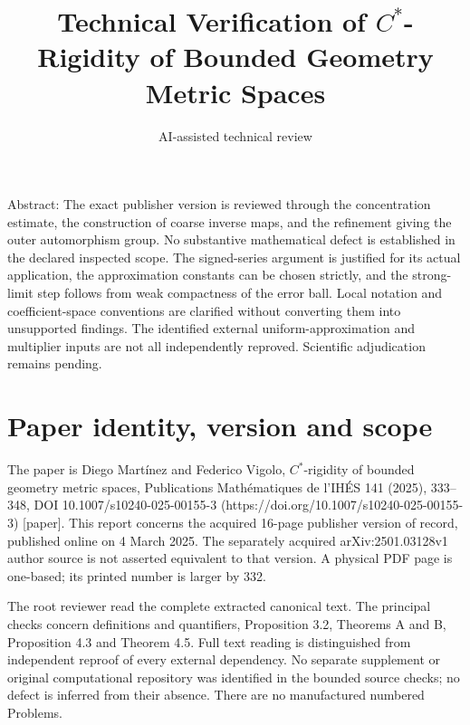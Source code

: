 \documentclass[10pt]{article}
\title{Technical Verification of
\(C^*\)-Rigidity of Bounded Geometry Metric Spaces}
\author{AI-assisted technical review}
\date{}
\begin{document}
\maketitle
Abstract: The exact publisher version is reviewed through the concentration estimate, the construction of coarse inverse maps, and the refinement giving the outer automorphism group. No substantive mathematical defect is established in the declared inspected scope. The signed-series argument is justified for its actual application, the approximation constants can be chosen strictly, and the strong-limit step follows from weak compactness of the error ball. Local notation and coefficient-space conventions are clarified without converting them into unsupported findings. The identified external uniform-approximation and multiplier inputs are not all independently reproved. Scientific adjudication remains pending.\par
\section*{Paper identity, version and scope}
The paper is Diego Martínez and Federico Vigolo, \(C^*\)-rigidity of bounded geometry metric spaces, Publications Mathématiques de l’IHÉS 141 (2025), 333–348, DOI 10.1007/s10240-025-00155-3 (https://doi.org/10.1007/s10240-025-00155-3) [paper]. This report concerns the acquired 16-page publisher version of record, published online on 4 March 2025. The separately acquired arXiv:2501.03128v1 author source is not asserted equivalent to that version. A physical PDF page is one-based; its printed number is larger by 332.\par
The root reviewer read the complete extracted canonical text. The principal checks concern definitions and quantifiers, Proposition 3.2, Theorems A and B, Proposition 4.3 and Theorem 4.5. Full text reading is distinguished from independent reproof of every external dependency. No separate supplement or original computational repository was identified in the bounded source checks; no defect is inferred from their absence. There are no manufactured numbered Problems.\par
\end{document}
